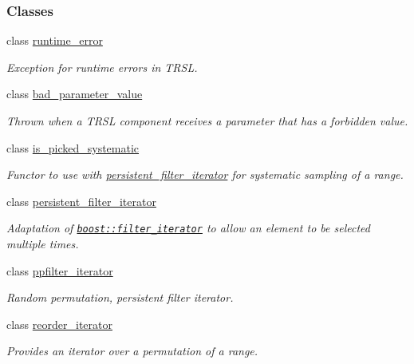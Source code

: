 \subsubsection*{Classes}
\begin{DoxyCompactItemize}
\item 
class \hyperlink{classtrsl_1_1runtime__error}{runtime\_\-error}
\begin{DoxyCompactList}\small\item\em Exception for runtime errors in TRSL. \item\end{DoxyCompactList}\item 
class \hyperlink{classtrsl_1_1bad__parameter__value}{bad\_\-parameter\_\-value}
\begin{DoxyCompactList}\small\item\em Thrown when a TRSL component receives a parameter that has a forbidden value. \item\end{DoxyCompactList}\item 
class \hyperlink{classtrsl_1_1is__picked__systematic}{is\_\-picked\_\-systematic}
\begin{DoxyCompactList}\small\item\em Functor to use with \hyperlink{classtrsl_1_1persistent__filter__iterator}{persistent\_\-filter\_\-iterator} for systematic sampling of a range. \item\end{DoxyCompactList}\item 
class \hyperlink{classtrsl_1_1persistent__filter__iterator}{persistent\_\-filter\_\-iterator}
\begin{DoxyCompactList}\small\item\em Adaptation of \href{http://www.boost.org/libs/iterator/doc/filter_iterator.html}{\tt boost::filter\_\-iterator} to allow an element to be selected multiple times. \item\end{DoxyCompactList}\item 
class \hyperlink{classtrsl_1_1ppfilter__iterator}{ppfilter\_\-iterator}
\begin{DoxyCompactList}\small\item\em Random permutation, persistent filter iterator. \item\end{DoxyCompactList}\item 
class \hyperlink{classtrsl_1_1reorder__iterator}{reorder\_\-iterator}
\begin{DoxyCompactList}\small\item\em Provides an iterator over a permutation of a range. \item\end{DoxyCompactList}\item 

\end{DoxyCompactItemize}
